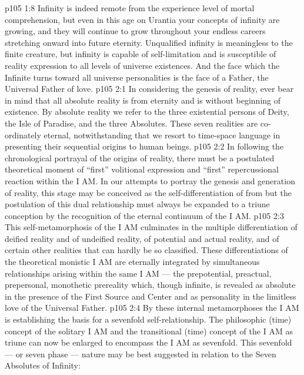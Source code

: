 \vs p105 1:8 Infinity is indeed remote from the experience level of mortal comprehension, but even in this age on Urantia your concepts of infinity are growing, and they will continue to grow throughout your endless careers stretching onward into future eternity. Unqualified infinity is meaningless to the finite creature, but infinity is capable of self\hyp{}limitation and is susceptible of reality expression to all levels of universe existences. And the face which the Infinite turns toward all universe personalities is the face of a Father, the Universal Father of love.
\vs p105 2:1 In considering the genesis of reality, ever bear in mind that all absolute reality is from eternity and is without beginning of existence. By absolute reality we refer to the three existential persons of Deity, the Isle of Paradise, and the three Absolutes. These seven realities are co\hyp{}ordinately eternal, notwithstanding that we resort to time\hyp{}space language in presenting their sequential origins to human beings.
\vs p105 2:2 \pc In following the chronological portrayal of the origins of reality, there must be a postulated theoretical moment of “first” volitional expression and “first” repercussional reaction within the I AM. In our attempts to portray the genesis and generation of reality, this stage may be conceived as the self\hyp{}differentiation of  from  but the postulation of this dual relationship must always be expanded to a triune conception by the recognition of the eternal continuum of  the I AM.
\vs p105 2:3 This self\hyp{}metamorphosis of the I AM culminates in the multiple differentiation of deified reality and of undeified reality, of potential and actual reality, and of certain other realities that can hardly be so classified. These differentiations of the theoretical monistic I AM are eternally integrated by simultaneous relationships arising within the same I AM --- the prepotential, preactual, prepersonal, monothetic prereality which, though infinite, is revealed as absolute in the presence of the First Source and Center and as personality in the limitless love of the Universal Father.
\vs p105 2:4 By these internal metamorphoses the I AM is establishing the basis for a sevenfold self\hyp{}relationship. The philosophic (time) concept of the solitary I AM and the transitional (time) concept of the I AM as triune can now be enlarged to encompass the I AM as sevenfold. This sevenfold --- or seven phase --- nature may be best suggested in relation to the Seven Absolutes of Infinity:
